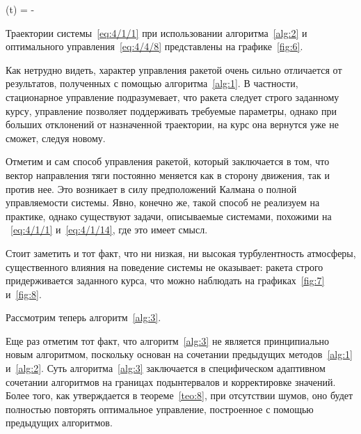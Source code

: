 	\optU(t) = - 
\eeq

Траектории системы~\ref{eq:4/1/1} при использовании алгоритма~\ref{alg:2} и оптимального управления~\ref{eq:4/4/8} представлены на графике~\ref{fig:6}.


Как нетрудно видеть, характер управления ракетой очень сильно отличается от результатов, полученных с помощью алгоритма~\ref{alg:1}. В частности, стационарное управление подразумевает, что ракета следует строго заданному курсу, управление позволяет поддерживать требуемые параметры, однако при больших отклонений от назначенной траектории, на курс она вернутся уже не сможет, следуя новому.

Отметим и сам способ управления ракетой, который заключается в том, что вектор направления тяги постоянно меняется как в сторону движения, так и против нее. Это возникает в силу предположений Калмана\cite{KALMAN1} о полной управляемости системы. Явно, конечно же, такой способ не реализуем на практике, однако существуют задачи, описываемые системами, похожими на ~\ref{eq:4/1/1} и~\ref{eq:4/1/14}, где это имеет смысл.

Стоит заметить и тот факт, что ни низкая, ни высокая турбулентность атмосферы, существенного влияния на поведение системы не оказывает: ракета строго придерживается заданного курса, что можно наблюдать на графиках~\ref{fig:7} и~\ref{fig:8}.


\br

Рассмотрим теперь алгоритм~\vref{alg:3}.

Еще раз отметим тот факт, что алгоритм~\ref{alg:3} не является принципиально новым алгоритмом, поскольку основан на сочетании предыдущих методов~\ref{alg:1} и~\ref{alg:2}. Суть алгоритма~\ref{alg:3} заключается в специфическом адаптивном сочетании алгоритмов на границах подынтервалов и корректировке значений. Более того, как утверждается в теореме~\vref{teo:8}, при отсутствии шумов, оно будет полностью повторять оптимальное управление, построенное с помощью предыдущих алгоритмов.

